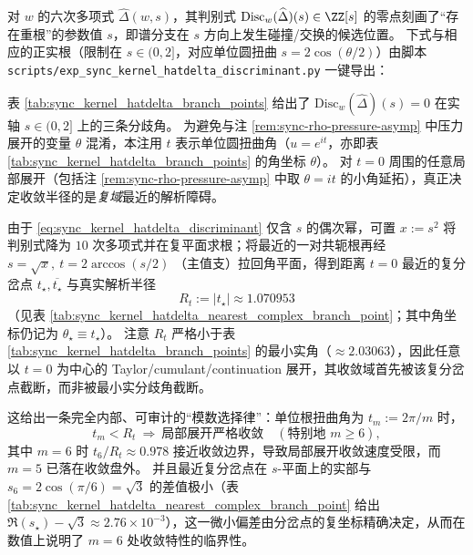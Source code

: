 \begin{remark}\label{rem:sync-hatdelta-discriminant-branch}
对 \(w\) 的六次多项式 \(\widehat\Delta(w,s)\)，其判别式 \(\mathrm{Disc}_w(\widehat\Delta)(s)\in\ZZ[s]\) 的零点刻画了“存在重根”的参数值 \(s\)，即谱分支在 \(s\) 方向上发生碰撞/交换的候选位置。
下式与相应的正实根（限制在 \(s\in(0,2]\)，对应单位圆扭曲 \(s=2\cos(\theta/2)\)）由脚本 \texttt{scripts/exp\_sync\_kernel\_hatdelta\_discriminant.py} 一键导出：


\end{remark}

\begin{remark}[真实解析半径：最近复分岔点钉死 \texorpdfstring{$t=0$}{t=0} 的收敛盘]\label{rem:sync-hatdelta-analytic-radius-complex}
表 \ref{tab:sync_kernel_hatdelta_branch_points} 给出了 \(\mathrm{Disc}_w(\widehat\Delta)(s)=0\) 在实轴 \(s\in(0,2]\) 上的三条分歧角。
为避免与注 \ref{rem:sync-rho-pressure-asymp} 中压力展开的变量 \(\theta\) 混淆，本注用 \(t\) 表示单位圆扭曲角（\(u=e^{it}\)，亦即表 \ref{tab:sync_kernel_hatdelta_branch_points} 的角坐标 \(\theta\)）。
对 \(t=0\) 周围的任意局部展开（包括注 \ref{rem:sync-rho-pressure-asymp} 中取 \(\theta=it\) 的小角延拓），真正决定收敛半径的是\emph{复域}最近的解析障碍。
\par
由于 \eqref{eq:sync_kernel_hatdelta_discriminant} 仅含 \(s\) 的偶次幂，可置 \(x:=s^2\) 将判别式降为 \(10\) 次多项式并在复平面求根；将最近的一对共轭根再经
\(
s=\sqrt{x},\ 
t=2\arccos(s/2)
\)
（主值支）拉回角平面，得到距离 \(t=0\) 最近的复分岔点 \(t_\star,\overline{t_\star}\) 与真实解析半径
\[
\boxed{\;R_t:=|t_\star|\approx 1.070953\;}
\]
（见表 \ref{tab:sync_kernel_hatdelta_nearest_complex_branch_point}；其中角坐标仍记为 \(\theta_\star\equiv t_\star\)）。
注意 \(R_t\) 严格小于表 \ref{tab:sync_kernel_hatdelta_branch_points} 的最小实角（\(\approx 2.03063\)），因此任意以 \(t=0\) 为中心的 Taylor/cumulant/continuation 展开，其收敛域首先被该复分岔点截断，而非被最小实分歧角截断。
\par
这给出一条完全内部、可审计的“模数选择律”：单位根扭曲角为 \(t_m:=2\pi/m\) 时，
\[
t_m<R_t\ \Longrightarrow\ \text{局部展开严格收敛}\quad(\text{特别地 }m\ge 6),
\]
其中 \(m=6\) 时 \(t_6/R_t\approx 0.978\) 接近收敛边界，导致局部展开收敛速度受限，而 \(m=5\) 已落在收敛盘外。
并且最近复分岔点在 \(s\)-平面上的实部与 \(s_6=2\cos(\pi/6)=\sqrt3\) 的差值极小（表 \ref{tab:sync_kernel_hatdelta_nearest_complex_branch_point} 给出 \(\Re(s_\star)-\sqrt3\approx 2.76\times 10^{-3}\)），这一微小偏差由分岔点的复坐标精确决定，从而在数值上说明了 \(m=6\) 处收敛特性的临界性。

\end{remark}
